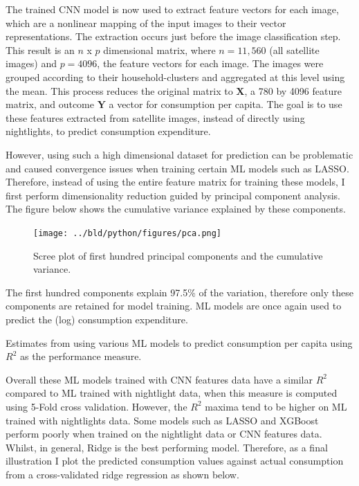 \documentclass[11pt, a4paper, leqno]{article}
\begin{document}
 The trained CNN model is now used to extract feature vectors for each image, which are a nonlinear mapping of the input images to their vector representations. The extraction occurs just before the image classification step. This result is an $n$ x $p$ dimensional matrix, where $n = 11,560$ (all satellite images) and $p = 4096$, the feature vectors for each image. The images were grouped according to their household-clusters and aggregated at this level using the mean. This process reduces the original matrix to $\textbf{X}$, a 780 by 4096 feature matrix, and outcome $\textbf{Y}$ a vector for consumption per capita. The goal is to use these features extracted from satellite images, instead of directly using nightlights, to predict consumption expenditure.

 However, using such a high dimensional dataset for prediction can be problematic and caused convergence issues when training certain ML models such as LASSO. Therefore, instead of using the entire feature matrix for training these models, I first perform dimensionality reduction guided by principal component analysis. The figure below shows the cumulative variance explained by these components. 

\begin{figure}[H]
\centering
    \texttt{[image: ../bld/python/figures/pca.png]}
    \caption{Scree plot of first hundred principal components and the cumulative variance.}
    \label{fig:python-predictions}
\end{figure}

 The first hundred components explain 97.5\% of the variation, therefore only these components are retained for model training. ML models are once again used to predict the (log) consumption expenditure.

\begin{table}[H]
\centering
    \scalebox{1.1}{}
	\caption{Estimates from using various ML models to predict consumption per capita using $R^2$ as the performance measure.}
\end{table}

 Overall these ML models trained with CNN features data have a similar $R^2$  compared to ML trained with nightlight data, when this measure is computed using 5-Fold cross validation. However, the $R^2$ maxima tend to be higher on ML trained with nightlights data. Some models such as LASSO and XGBoost perform poorly when trained on the nightlight data or CNN features data. Whilst, in general, Ridge is the best performing model. Therefore, as a final illustration I plot the predicted consumption values against actual consumption from a cross-validated ridge regression as shown below.
\end{document}
